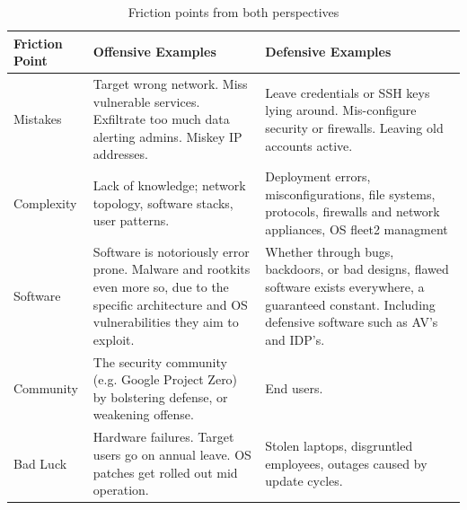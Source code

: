 \documentclass[11pt]{report}
\begin{document}
\begin{table}[!th]
	\begin{tabular}{ |p{2cm}|p{4.5cm}|p{4.5cm}| }
		\hline
		\textbf{Friction Point} & \textbf{Offensive Examples} & \textbf{Defensive Examples}                                                                                                                                                                                                                                               \\
		\hline
		Mistakes & Target wrong network. Miss vulnerable services. Exfiltrate too much data alerting admins. Miskey IP addresses. & Leave credentials or SSH keys lying around. Mis-configure security or firewalls. Leaving old accounts active.                                                                                         \\
		\hline
		Complexity & Lack of knowledge; network topology, software stacks, user patterns. & Deployment errors, misconfigurations, file systems, protocols, firewalls and network appliances, OS fleet2 managment                                                                                                                          \\
		\hline
		Software & Software is notoriously error prone. Malware and rootkits even more so, due to the specific architecture and OS vulnerabilities they aim to exploit. & Whether through bugs, backdoors, or bad designs, flawed software exists everywhere, a guaranteed constant. Including defensive software such as AV’s and IDP’s. \\
		\hline
		Community & The security community (e.g. Google Project Zero) by bolstering defense, or weakening offense. & End users.                                                                                                                                                                                                           \\
		\hline
		Bad Luck & Hardware failures. Target users go on annual leave. OS patches get rolled out mid operation. & Stolen laptops, disgruntled employees, outages caused by update cycles.                                                                                                                                                 \\
		\hline
	\end{tabular}
	\caption{Friction points from both perspectives}
\end{table}
\end{document}
